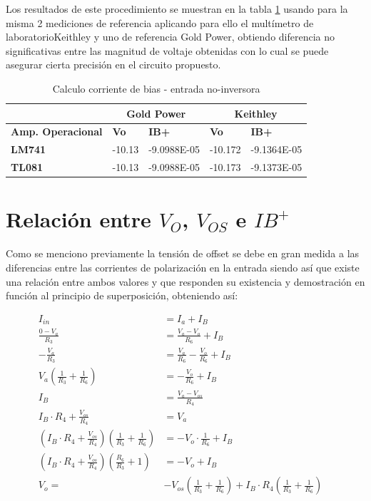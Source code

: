 Los resultados de este procedimiento se muestran en la tabla \ref{tab:valor-bias-noinversora} usando para la misma 2 mediciones de referencia aplicando para ello el multímetro de laboratorioKeithley y uno de referencia Gold Power, obtiendo diferencia no significativas entre las magnitud de voltaje obtenidas con lo cual se puede asegurar cierta precisión en el circuito propuesto.

\begin{table}[]
	\centering
	\begin{tabular}{|l|ll|ll|}
		\hline
		& \multicolumn{2}{c|}{\textbf{Gold   Power}}      & \multicolumn{2}{c|}{\textbf{Keithley}}          \\ \hline
		\textbf{Amp. Operacional} & \multicolumn{1}{l|}{\textbf{Vo}} & \textbf{IB+} & \multicolumn{1}{l|}{\textbf{Vo}} & \textbf{IB+} \\ \hline
		\textbf{LM741}            & \multicolumn{1}{l|}{-10.13}      & -9.0988E-05  & \multicolumn{1}{l|}{-10.172}     & -9.1364E-05  \\ \hline
		\textbf{TL081}            & \multicolumn{1}{l|}{-10.13}      & -9.0988E-05  & \multicolumn{1}{l|}{-10.173}     & -9.1373E-05  \\ \hline
	\end{tabular}
	\caption{Calculo corriente de bias - entrada no-inversora}
	\label{tab:valor-bias-noinversora}
\end{table}

\section{Relación entre $V_O$, $V_{OS}$ e $IB^+$}
Como se menciono previamente la tensión de offset se debe en gran medida a las diferencias entre las corrientes de polarización en la entrada siendo así que existe una relación entre ambos valores y que responden su existencia y demostración en función al principio de superposición, obteniendo así:

\begin{align}
	I_{in} &= I_a + I_B \\
	\frac{0 - V_a}{R_3} &= \frac{V_a - V_o}{R_6} + I_B \\
	-\frac{V_a}{R_3} &= \frac{V_a}{R_6} - \frac{V_o}{R_6} + I_B \\
	V_a \left(\frac{1}{R_3} + \frac{1}{R_6}\right) &= -\frac{V_o}{R_6} + I_B \tag{*} \\	
	I_B &= \frac{V_a - V_{os}}{R_4} \\
	I_B \cdot R_4 + \frac{V_{os}}{R_4} &= V_a \\
	\left(I_B \cdot R_4 + \frac{V_{os}}{R_4}\right)\left(\frac{1}{R_3} + \frac{1}{R_6}\right) &= -V_o \cdot \frac{1}{R_6} + I_B \\
	\left(I_B \cdot R_4 + \frac{V_{os}}{R_4}\right)\left(\frac{R_6}{R_3} + 1\right) &= -V_o + I_B \\ 
	V_o =& -V_{os}\left(\frac{1}{R_3} + \frac{1}{R_6}\right) + I_B \cdot R_4 \left(\frac{1}{R_3} + \frac{1}{R_6}\right) 
	\quad
\end{align}

